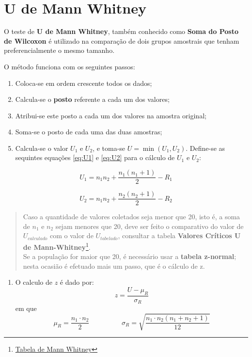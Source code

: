 \documentclass[
]{book}
\providecommand{\tightlist}{%
  \setlength{\itemsep}{0pt}\setlength{\parskip}{0pt}}
\begin{document}
\hypertarget{u-de-mann-whitney}{%
\section{U de Mann Whitney}\label{u-de-mann-whitney}}

O teste de \textbf{U de Mann Whitney}, também conhecido como \textbf{Soma do Posto de Wilcoxon} é utilizado na comparação de dois grupos amostrais que tenham preferencialmente o mesmo tamanho.

O método funciona com os seguintes passos:

\begin{enumerate}
\def\labelenumi{\arabic{enumi}.}
\tightlist
\item
  Coloca-se em ordem crescente todos os dados;
\item
  Calcula-se o \textbf{posto} referente a cada um dos valores;
\item
  Atribui-se este posto a cada um dos valores na amostra original;
\item
  Soma-se o posto de cada uma das duas amostras;
\item
  Calcula-se o valor \(U_1\) e \(U_2\), e toma-se \(U = \min(U_1,U_2)\). Define-se as sequintes equações \eqref{eq:U1} e \eqref{eq:U2} para o cálculo de \(U_1\) e \(U_2\):
\end{enumerate}

\begin{equation}
  U_1 = n_1 n_2 + \frac{n_1(n_1+1)}{2} - R_1 
  \label{eq:U1}
\end{equation}

\begin{equation}
U_2 = n_1 n_2 + \frac{n_2(n_2+1)}{2} - R_2
\label{eq:U2}
\end{equation}

\begin{quote}
Caso a quantidade de valores coletados seja menor que 20, isto é, a soma de \(n_1\) e \(n_2\) sejam menores que 20, deve ser feito o comparativo do valor de \(U_{calculado}\) com o valor de \(U_{tabelado}\), consultar a tabela \textbf{Valores Críticos U de Mann-Whitney}\footnote{\href{https://ocw.umb.edu/psychology/psych-270/other-materials/RelativeResourceManager.pdf}{Tabela de Mann Whitney}}.\\
Se a população for maior que 20, é necessário usar a \textbf{tabela z-normal}; nesta ocasião é efetuado mais um passo, que é o cálculo de z.
\end{quote}

\begin{enumerate}
\def\labelenumi{\arabic{enumi}.}
\setcounter{enumi}{5}
\tightlist
\item
  O calculo de \(z\) é dado por:
  \begin{equation}
  z = \frac{U - \mu_R}{\sigma_R}
  \label{eq:zMannWhitney}
  \end{equation}
  em que
  \[ 
  \mu_R = \frac{n_1 \cdot n_2}{2} \hspace{2cm} \sigma_R = \sqrt{\frac{n_1 \cdot n_2(n_1 + n_2 + 1)}{12}}
  \]
\end{enumerate}
\end{document}
